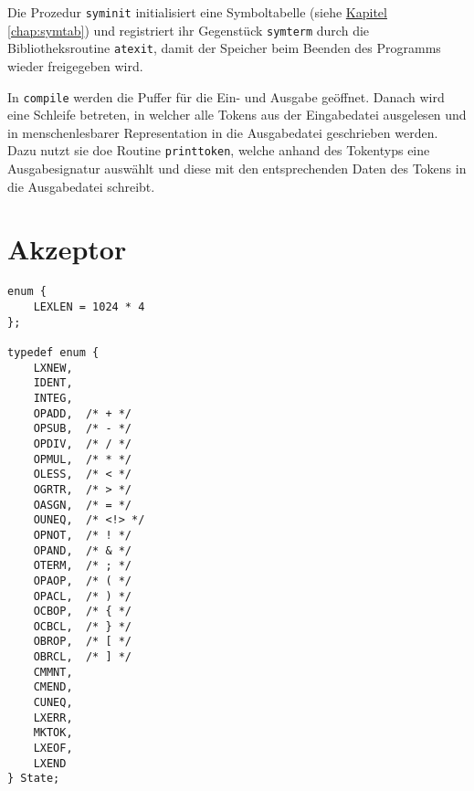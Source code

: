 Die Prozedur \texttt{syminit} initialisiert eine Symboltabelle (siehe \hyperref[chap:symtab]{Kapitel \ref{chap:symtab}})
und registriert ihr Gegenstück \texttt{symterm} durch die Bibliotheksroutine \texttt{atexit},
damit der Speicher beim Beenden des Programms wieder freigegeben wird.

In \texttt{compile} werden die Puffer für die Ein- und Ausgabe geöffnet.
Danach wird eine Schleife betreten,
in welcher alle Tokens aus der Eingabedatei ausgelesen
und in menschenlesbarer Representation in die Ausgabedatei geschrieben werden.
Dazu nutzt sie doe Routine \texttt{printtoken},
welche anhand des Tokentyps eine Ausgabesignatur auswählt
und diese mit den entsprechenden Daten des Tokens in die Ausgabedatei schreibt.

\section{Akzeptor}
\label{sec:scanner_acceptor}

\begin{lstlisting}
enum {
	LEXLEN = 1024 * 4
};

typedef enum {
	LXNEW,
	IDENT,
	INTEG,
	OPADD,	/* + */
	OPSUB,	/* - */
	OPDIV,	/* / */
	OPMUL,	/* * */
	OLESS,	/* < */
	OGRTR,	/* > */
	OASGN,	/* = */
	OUNEQ,	/* <!> */
	OPNOT,	/* ! */
	OPAND,	/* & */
	OTERM,	/* ; */
	OPAOP,	/* ( */
	OPACL,	/* ) */
	OCBOP,	/* { */
	OCBCL,	/* } */
	OBROP,	/* [ */
	OBRCL,	/* ] */
	CMMNT,
	CMEND,
	CUNEQ,
	LXERR,
	MKTOK,
	LXEOF,
	LXEND
} State;
\end{lstlisting}
